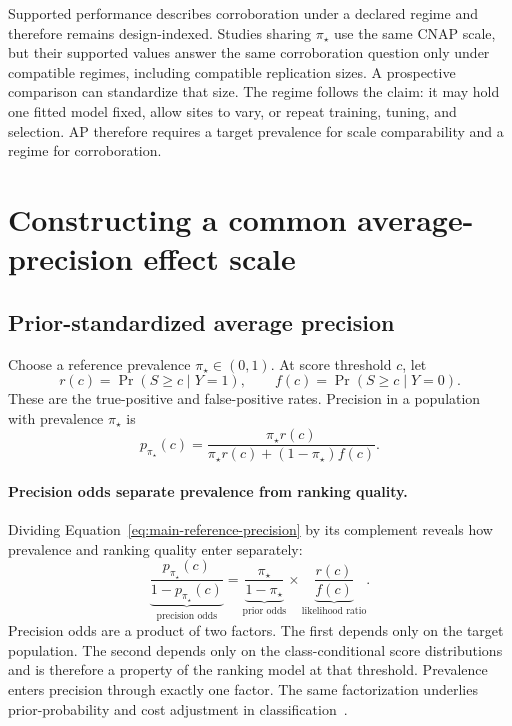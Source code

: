 \documentclass[11pt]{article}
\theoremstyle{remark}
\begin{document}
Supported performance describes corroboration under a declared regime and therefore remains design-indexed. Studies sharing $\pi_\star$ use the same CNAP scale, but their supported values answer the same corroboration question only under compatible regimes, including compatible replication sizes. A prospective comparison can standardize that size. The regime follows the claim: it may hold one fitted model fixed, allow sites to vary, or repeat training, tuning, and selection. AP therefore requires a target prevalence for scale comparability and a regime for corroboration.

\section{Constructing a common average-precision effect scale}
\label{sec:common-scale}

\subsection{Prior-standardized average precision}

Choose a reference prevalence $\pi_\star\in(0,1)$. At score threshold $c$, let
\[
r(c)=\Pr(S\geq c\mid Y=1),
\qquad
f(c)=\Pr(S\geq c\mid Y=0).
\]
These are the true-positive and false-positive rates. Precision in a population with prevalence $\pi_\star$ is
\begin{equation}
 p_{\pi_\star}(c)
 =
 \frac{\pi_\star r(c)}
 {\pi_\star r(c)+(1-\pi_\star)f(c)}.
 \label{eq:main-reference-precision}
\end{equation}

\paragraph{Precision odds separate prevalence from ranking quality.}
Dividing Equation~\eqref{eq:main-reference-precision} by its complement reveals how prevalence and ranking quality enter separately:
\begin{equation}
\underbrace{\frac{p_{\pi_\star}(c)}{1-p_{\pi_\star}(c)}}_{\text{precision odds}}
=
\underbrace{\frac{\pi_\star}{1-\pi_\star}}_{\text{prior odds}}
\times
\underbrace{\frac{r(c)}{f(c)}}_{\text{likelihood ratio}}.
\label{eq:odds}
\end{equation}
Precision odds are a product of two factors. The first depends only on the target population. The second depends only on the class-conditional score distributions and is therefore a property of the ranking model at that threshold. Prevalence enters precision through exactly one factor. The same factorization underlies prior-probability and cost adjustment in classification~\cite{elkan2001foundations}.
\end{document}
